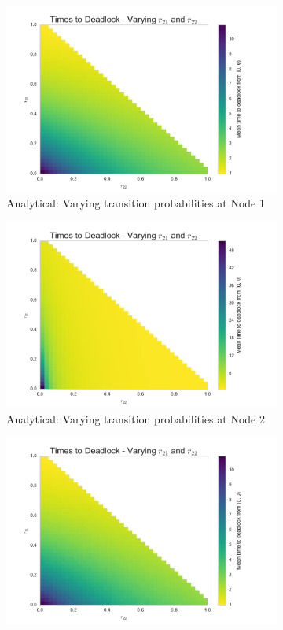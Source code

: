 \documentclass{article}
\begin{document}
\begin{figure}[!htbp]
\begin{subfigure}[b]{0.5\textwidth}
  \includegraphics[width=\textwidth]{images/N1_heatmap}
  \caption{Analytical: Varying transition probabilities at Node 1}
  \label{fig:heatmap_anal_1}
\end{subfigure}
\begin{subfigure}[b]{0.5\textwidth}
  \includegraphics[width=\textwidth]{images/N2_heatmap}
  \caption{Analytical: Varying transition probabilities at Node 2}
  \label{fig:heatmap_anal_2}
\end{subfigure}
\begin{subfigure}[b]{0.5\textwidth}
  \includegraphics[width=\textwidth]{images/N1_heatmap_sim}

\end{subfigure}
\end{figure}
\end{document}
